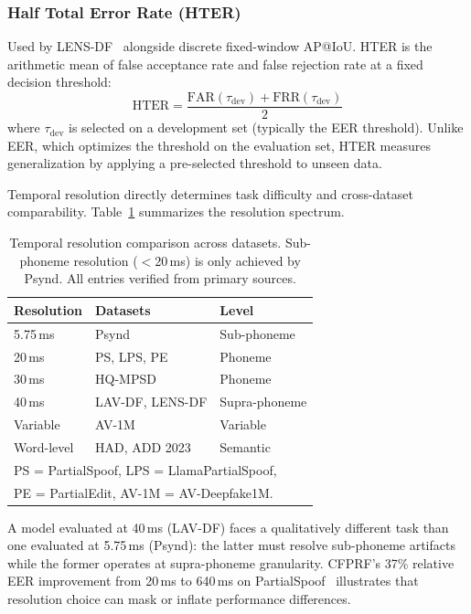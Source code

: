 \documentclass[journal]{IEEEtran}
\begin{document}
\subsubsection{Half Total Error Rate (HTER)}

Used by LENS-DF~\cite{liu2025lensdf} alongside discrete fixed-window AP@IoU. HTER is the arithmetic mean of false acceptance rate and false rejection rate at a fixed decision threshold:
\begin{equation}
\label{eq:hter}
\text{HTER} = \frac{\text{FAR}(\tau_\text{dev}) + \text{FRR}(\tau_\text{dev})}{2}
\end{equation}
where $\tau_\text{dev}$ is selected on a development set (typically the EER threshold). Unlike EER, which optimizes the threshold on the evaluation set, HTER measures generalization by applying a pre-selected threshold to unseen data.

Temporal resolution directly determines task difficulty and cross-dataset comparability. Table~\ref{tab:resolution} summarizes the resolution spectrum.

\begin{table}[t]
\centering
\caption{Temporal resolution comparison across datasets. Sub-phoneme resolution ($<$20\,ms) is only achieved by Psynd. All entries verified from primary sources.}
\label{tab:resolution}
\small
\begin{tabular}{lll}
\toprule
\textbf{Resolution} & \textbf{Datasets} & \textbf{Level} \\
\midrule
5.75\,ms & Psynd & Sub-phoneme \\
20\,ms & PS, LPS, PE & Phoneme \\
30\,ms & HQ-MPSD & Phoneme \\
40\,ms & LAV-DF, LENS-DF & Supra-phoneme \\
Variable & AV-1M & Variable \\
Word-level & HAD, ADD 2023 & Semantic \\
\bottomrule
\multicolumn{3}{l}{\footnotesize PS = PartialSpoof, LPS = LlamaPartialSpoof,} \\
\multicolumn{3}{l}{\footnotesize PE = PartialEdit, AV-1M = AV-Deepfake1M.}
\end{tabular}
\end{table}

A model evaluated at 40\,ms (LAV-DF) faces a qualitatively different task than one evaluated at 5.75\,ms (Psynd): the latter must resolve sub-phoneme artifacts while the former operates at supra-phoneme granularity. CFPRF's 37\% relative EER improvement from 20\,ms to 640\,ms on PartialSpoof~\cite{luong2025metrics} illustrates that resolution choice can mask or inflate performance differences.
\end{document}
